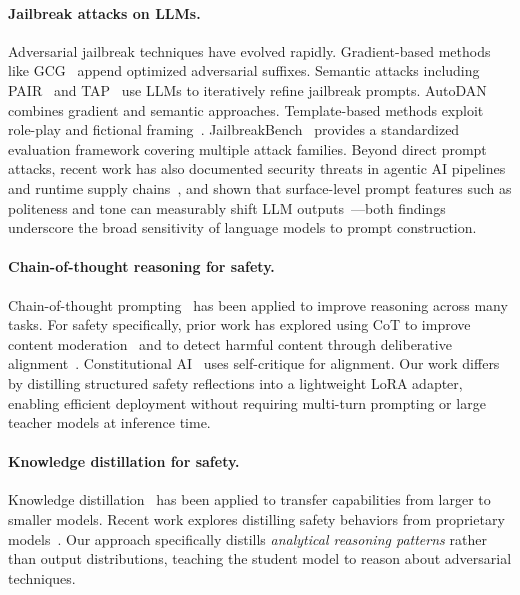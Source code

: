 \documentclass[ai,article,submit,pdftex,moreauthors]{Definitions/mdpi}
\begin{document}
\paragraph{Jailbreak attacks on LLMs.}
Adversarial jailbreak techniques have evolved rapidly. Gradient-based methods like GCG~\citep{zou2023universal} append optimized adversarial suffixes. Semantic attacks including PAIR~\citep{chao2023jailbreaking} and TAP~\citep{mehrotra2024tree} use LLMs to iteratively refine jailbreak prompts. AutoDAN~\citep{liu2024autodan} combines gradient and semantic approaches. Template-based methods exploit role-play and fictional framing~\citep{wei2024jailbroken, shen2024anything}. JailbreakBench~\citep{chao2024jailbreakbench} provides a standardized evaluation framework covering multiple attack families. Beyond direct prompt attacks, recent work has also documented security threats in agentic AI pipelines and runtime supply chains~\citep{jiang2026agentic}, and shown that surface-level prompt features such as politeness and tone can measurably shift LLM outputs~\citep{cai2025tone}---both findings underscore the broad sensitivity of language models to prompt construction.

\paragraph{Chain-of-thought reasoning for safety.}
Chain-of-thought prompting~\citep{wei2022chain} has been applied to improve reasoning across many tasks. For safety specifically, prior work has explored using CoT to improve content moderation~\citep{wang2024chain} and to detect harmful content through deliberative alignment~\citep{bai2024deliberative}. Constitutional AI~\citep{bai2022constitutional} uses self-critique for alignment. Our work differs by distilling structured safety reflections into a lightweight LoRA adapter, enabling efficient deployment without requiring multi-turn prompting or large teacher models at inference time.

\paragraph{Knowledge distillation for safety.}
Knowledge distillation~\citep{hinton2015distilling} has been applied to transfer capabilities from larger to smaller models. Recent work explores distilling safety behaviors from proprietary models~\citep{tunstall2023zephyr}. Our approach specifically distills \emph{analytical reasoning patterns} rather than output distributions, teaching the student model to reason about adversarial techniques.
\end{document}
